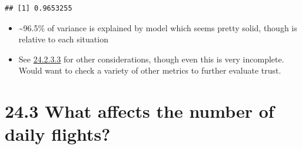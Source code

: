 \documentclass[]{book}
\newenvironment{Shaded}{\begin{snugshade}}{\end{snugshade}}
\newcommand{\DataTypeTok}[1]{\textcolor[rgb]{0.13,0.29,0.53}{#1}}
\newcommand{\DecValTok}[1]{\textcolor[rgb]{0.00,0.00,0.81}{#1}}
\newcommand{\KeywordTok}[1]{\textcolor[rgb]{0.13,0.29,0.53}{\textbf{#1}}}
\newcommand{\NormalTok}[1]{#1}
\newcommand{\OperatorTok}[1]{\textcolor[rgb]{0.81,0.36,0.00}{\textbf{#1}}}
\newcommand{\StringTok}[1]{\textcolor[rgb]{0.31,0.60,0.02}{#1}}
\providecommand{\tightlist}{%
  \setlength{\itemsep}{0pt}\setlength{\parskip}{0pt}}
\theoremstyle{definition}
\theoremstyle{definition}
\theoremstyle{definition}
\theoremstyle{remark}
\begin{document}
\begin{enumerate}
\begin{Shaded}
\end{Shaded}

\begin{verbatim}
## [1] 0.9653255
\end{verbatim}

  \begin{itemize}
  \tightlist
  \item
    \textasciitilde{}96.5\% of variance is explained by model which
    seems pretty solid, though is relative to each situation
  \item
    See \protect\hyperlink{section-84}{24.2.3.3} for other
    considerations, though even this is very incomplete. Would want to
    check a variety of other metrics to further evaluate trust.
  \end{itemize}
\end{enumerate}

\hypertarget{what-affects-the-number-of-daily-flights}{%
\section{24.3 What affects the number of daily
flights?}\label{what-affects-the-number-of-daily-flights}}
\end{document}

